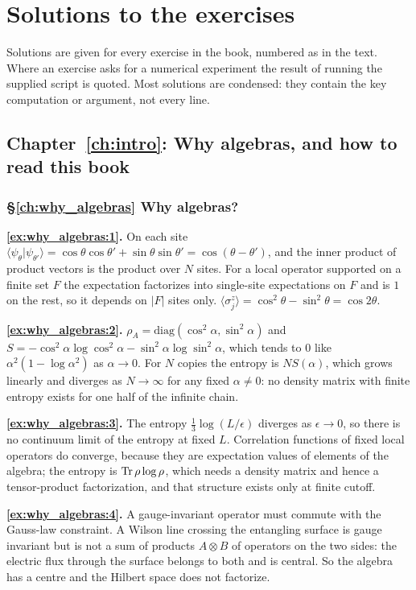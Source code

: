 \chapter{Solutions to the exercises}\label{app:solutions}
Solutions are given for every exercise in the book, numbered as in the text. Where an exercise asks for a numerical experiment the result of running the supplied script is quoted. Most solutions are condensed: they contain the key computation or argument, not every line.

{\setlength{\parindent}{0pt}\setlength{\parskip}{4pt}

\section*{Chapter~\ref{ch:intro}: Why algebras, and how to read this book}

\subsection*{\S\ref{ch:why_algebras} Why algebras?}
\textbf{\ref{ex:why_algebras:1}.} On each site $\langle\psi_\theta|\psi_{\theta'}\rangle=\cos\theta\cos\theta'+\sin\theta\sin\theta'=\cos(\theta-\theta')$, and the inner product of product vectors is the product over $N$ sites. For a local operator supported on a finite set $F$ the expectation factorizes into single-site expectations on $F$ and is $1$ on the rest, so it depends on $|F|$ sites only. $\langle\sigma^z_j\rangle=\cos^2\theta-\sin^2\theta=\cos2\theta$.\par
\textbf{\ref{ex:why_algebras:2}.} $\rho_A=\mathrm{diag}(\cos^2\alpha,\sin^2\alpha)$ and $S=-\cos^2\alpha\log\cos^2\alpha-\sin^2\alpha\log\sin^2\alpha$, which tends to $0$ like $\alpha^2(1-\log\alpha^2)$ as $\alpha\to0$. For $N$ copies the entropy is $NS(\alpha)$, which grows linearly and diverges as $N\to\infty$ for any fixed $\alpha\ne0$: no density matrix with finite entropy exists for one half of the infinite chain.\par
\textbf{\ref{ex:why_algebras:3}.} The entropy $\frac13\log(L/\epsilon)$ diverges as $\epsilon\to0$, so there is no continuum limit of the entropy at fixed $L$. Correlation functions of fixed local operators do converge, because they are expectation values of elements of the algebra; the entropy is $\operatorname{Tr}\rho\log\rho$, which needs a density matrix and hence a tensor-product factorization, and that structure exists only at finite cutoff.\par
\textbf{\ref{ex:why_algebras:4}.} A gauge-invariant operator must commute with the Gauss-law constraint. A Wilson line crossing the entangling surface is gauge invariant but is not a sum of products $A\otimes B$ of operators on the two sides: the electric flux through the surface belongs to both and is central. So the algebra has a centre and the Hilbert space does not factorize.\par

}
